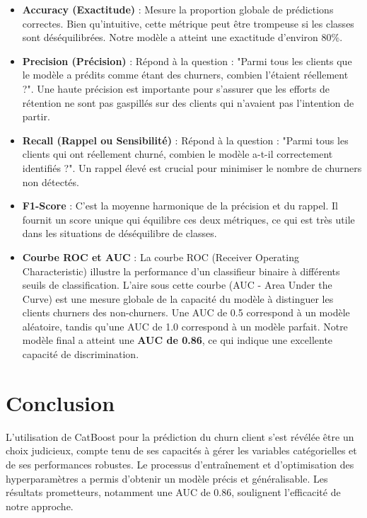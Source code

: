 \begin{itemize}
    \item \textbf{Accuracy (Exactitude)} : Mesure la proportion globale de prédictions correctes. Bien qu'intuitive, cette métrique peut être trompeuse si les classes sont déséquilibrées. Notre modèle a atteint une exactitude d'environ 80\%.
    
    \item \textbf{Precision (Précision)} : Répond à la question : "Parmi tous les clients que le modèle a prédits comme étant des churners, combien l'étaient réellement ?". Une haute précision est importante pour s'assurer que les efforts de rétention ne sont pas gaspillés sur des clients qui n'avaient pas l'intention de partir.
    
    \item \textbf{Recall (Rappel ou Sensibilité)} : Répond à la question : "Parmi tous les clients qui ont réellement churné, combien le modèle a-t-il correctement identifiés ?". Un rappel élevé est crucial pour minimiser le nombre de churners non détectés.
    
    \item \textbf{F1-Score} : C'est la moyenne harmonique de la précision et du rappel. Il fournit un score unique qui équilibre ces deux métriques, ce qui est très utile dans les situations de déséquilibre de classes.
    
    \item \textbf{Courbe ROC et AUC} : La courbe ROC (Receiver Operating Characteristic) illustre la performance d'un classifieur binaire à différents seuils de classification. L'aire sous cette courbe (AUC - Area Under the Curve) est une mesure globale de la capacité du modèle à distinguer les clients churners des non-churners. Une AUC de 0.5 correspond à un modèle aléatoire, tandis qu'une AUC de 1.0 correspond à un modèle parfait. Notre modèle final a atteint une \textbf{AUC de 0.86}, ce qui indique une excellente capacité de discrimination.
\end{itemize}


\section{Conclusion}
L'utilisation de CatBoost pour la prédiction du churn client s'est révélée être un choix judicieux, compte tenu de ses capacités à gérer les variables catégorielles et de ses performances robustes. Le processus d'entraînement et d'optimisation des hyperparamètres a permis d'obtenir un modèle précis et généralisable. Les résultats prometteurs, notamment une AUC de 0.86, soulignent l'efficacité de notre approche.

